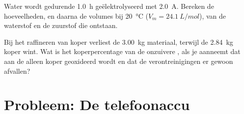 \begin{exercise}[$\star\star\star$]\label{exo:g12:cells-and-electrolysis:14}
Water wordt gedurende \qty{1.0}{h} geëlektrolyseerd met \qty{2.0}{A}.
Bereken de hoeveelheden, en daarna de volumes bij \qty{20}{\celsius}
($V_m = \qty{24.1}{L/mol}$), van de waterstof en de zuurstof die
ontstaan.
\end{exercise}

\begin{exercise}[$\star\star\star$]\label{exo:g12:cells-and-electrolysis:15}
Bij het raffineren van koper verliest de  \qty{3.00}{kg} materiaal,
terwijl de  \qty{2.84}{kg} koper wint. Wat is het
koperpercentage van de onzuivere , als je aanneemt dat aan de 
alleen koper geoxideerd wordt en dat de verontreinigingen er gewoon
afvallen?
\end{exercise}

\section{Probleem: De telefoonaccu}

